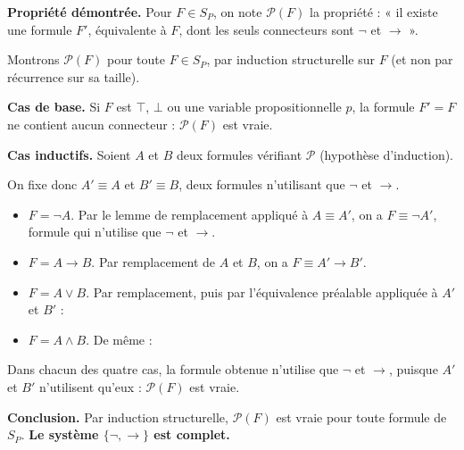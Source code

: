 \documentclass[11pt,a4paper]{article}
\providecommand{\tightlist}{\setlength{\itemsep}{0pt}\setlength{\parskip}{0pt}}
\newcommand{\equationajustee}[1]{%
  \sbox{\boiteequation}{$\displaystyle #1$}%
  \ifdim\wd\boiteequation>\linewidth
    \[\resizebox{\linewidth}{!}{\usebox{\boiteequation}}\]%
  \else
    \[#1\]%
  \fi}
\begin{document}
\textbf{Propriété démontrée.} Pour \(F \in S_P\), on note \(\mathcal{P}(F)\) la propriété : « il existe une formule \(F'\), équivalente à \(F\), dont les seuls connecteurs sont \(\neg\) et \(\to\) ».

Montrons \(\mathcal{P}(F)\) pour toute \(F \in S_P\), par induction structurelle sur \(F\) (et non par récurrence sur sa taille).

\textbf{Cas de base.} Si \(F\) est \(\top\), \(\bot\) ou une variable propositionnelle \(p\), la formule \(F' = F\) ne contient aucun connecteur : \(\mathcal{P}(F)\) est vraie.

\textbf{Cas inductifs.} Soient \(A\) et \(B\) deux formules vérifiant \(\mathcal{P}\) (hypothèse d'induction).

On fixe donc \(A' \equiv A\) et \(B' \equiv B\), deux formules n'utilisant que \(\neg\) et \(\to\).

\begin{itemize}
\tightlist
\item
  \(F = \neg A\). Par le lemme de remplacement appliqué à \(A \equiv A'\), on a \(F \equiv \neg A'\), formule qui n'utilise que \(\neg\) et \(\to\).
\item
  \(F = A \to B\). Par remplacement de \(A\) et \(B\), on a \(F \equiv A' \to B'\).
\item
  \(F = A \vee B\). Par remplacement, puis par l'équivalence préalable appliquée à \(A'\) et \(B'\) :
\end{itemize}

\equationajustee{\begin{aligned}
F &\equiv A' \vee B' \\
&\equiv \neg A' \to B'.
\end{aligned}}

\begin{itemize}
\tightlist
\item
  \(F = A \wedge B\). De même :
\end{itemize}

\equationajustee{\begin{aligned}
F &\equiv A' \wedge B' \\
&\equiv \neg(A' \to \neg B').
\end{aligned}}

Dans chacun des quatre cas, la formule obtenue n'utilise que \(\neg\) et \(\to\), puisque \(A'\) et \(B'\) n'utilisent qu'eux : \(\mathcal{P}(F)\) est vraie.

\textbf{Conclusion.} Par induction structurelle, \(\mathcal{P}(F)\) est vraie pour toute formule de \(S_P\). \textbf{Le système \(\{\neg, \to\}\) est complet.}
\end{document}
